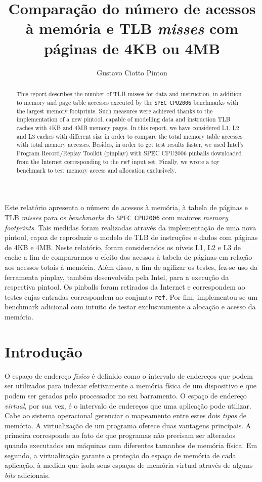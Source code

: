 \documentclass[12pt]{article}
\title{Comparação do número de acessos à memória e TLB \textit{misses} com
páginas de 4KB ou 4MB}
\author{Gustavo Ciotto Pinton\inst{1} }
\begin{document}
  

\maketitle

\begin{abstract}
This report describes the number of TLB misses for data and instruction, in
addition to memory and page table accesses executed by the \texttt{SPEC CPU2006}
benchmarks with the largest memory footprints. Such measures were achieved
thanks to the implementation of a new pintool, capable of modelling data and
instruction TLB caches with 4KB and 4MB memory pages. In this report, we have
considered L1, L2 and L3 caches with different size in order to compare the
total memory table  accesses with total memory accesses. Besides, in order to
get test results faster, we used Intel's Program Record/Replay Toolkit (pinplay)
with SPEC CPU2006 pinballs downloaded from the Internet corresponding to the
\texttt{ref} input set. Finally, we wrote a toy benchmark to test memory access
and allocation exclusively.
\end{abstract}
     
\begin{resumo} 
Este relatório apresenta o número de acessos à memória, à tabela de páginas e
TLB \textit{misses} para os \textit{benchmarks} do \texttt{SPEC
CPU2006} com maiores \textit{memory footprints}. Tais medidas foram
realizadas através da implementação de uma nova pintool, capaz de reproduzir o
modelo de TLB de instruções e dados com páginas de 4KB e 4MB. Neste relatório,
foram considerados os níveis L1, L2 e L3 de cache a fim de compararmos o efeito
dos acessos à tabela de páginas em relação aos acessos totais à memória.
Além disso, a fim de agilizar os testes, fez-se uso da ferramenta pinplay, também desenvolvida
pela Intel, para a execução da respectiva pintool. Os pinballs foram retirados
da Internet e correspondem ao testes cujas entradas correspondem ao conjunto
\texttt{ref}. Por fim, implementou-se um benchmark adicional com intuito de
testar exclusivamente a alocação e acesso da memória.
\end{resumo}

\section{Introdução}

O espaço de endereço \textit{físico} é definido como o intervalo de endereços
que podem ser utilizados para indexar efetivamente a memória física de um
dispositivo e que podem ser gerados pelo processador no seu barramento. O espaço
de endereço \textit{virtual}, por sua vez,  é o intervalo de endereços que uma
aplicação pode utilizar. Cabe ao sistema operacional gerenciar o mapeamento
entre estes dois \textit{tipos} de memória. A virtualização de um programa
oferece duas vantagens principais. A primeira corresponde ao fato de que
programas não precisam ser alterados quando executados em máquinas com
diferentes tamanhos de memória física. Em segundo, a virtualização garante a
proteção do espaço de memória de cada aplicação, à medida que isola seus espaços
de memória virtual através de alguns \textit{bits} adicionais. 
\end{document}
